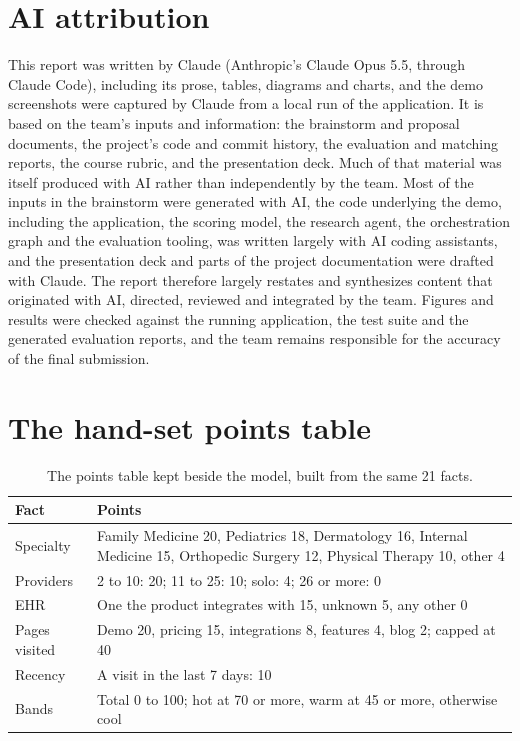 \documentclass[11pt]{article}
\begin{document}
\section*{AI attribution}\label{sec:ai-attribution}

This report was written by Claude (Anthropic's Claude Opus 5.5, through Claude Code), including its prose, tables, diagrams and charts, and the demo screenshots were captured by Claude from a local run of the application. It is based on the team's inputs and information: the brainstorm and proposal documents, the project's code and commit history, the evaluation and matching reports, the course rubric, and the presentation deck. Much of that material was itself produced with AI rather than independently by the team. Most of the inputs in the brainstorm were generated with AI, the code underlying the demo, including the application, the scoring model, the research agent, the orchestration graph and the evaluation tooling, was written largely with AI coding assistants, and the presentation deck and parts of the project documentation were drafted with Claude. The report therefore largely restates and synthesizes content that originated with AI, directed, reviewed and integrated by the team. Figures and results were checked against the running application, the test suite and the generated evaluation reports, and the team remains responsible for the accuracy of the final submission.

\appendix
\section{The hand-set points table}
\label{app:points}

\begin{table}[H]
\centering
\small
\caption{The points table kept beside the model, built from the same 21 facts.}
\begin{tabularx}{\textwidth}{@{}p{2.2cm}L@{}}
\toprule
Fact & Points \\
\midrule
Specialty & Family Medicine 20, Pediatrics 18, Dermatology 16, Internal Medicine 15, Orthopedic Surgery 12, Physical Therapy 10, other 4 \\
Providers & 2 to 10: 20; 11 to 25: 10; solo: 4; 26 or more: 0 \\
EHR & One the product integrates with 15, unknown 5, any other 0 \\
Pages visited & Demo 20, pricing 15, integrations 8, features 4, blog 2; capped at 40 \\
Recency & A visit in the last 7 days: 10 \\
Bands & Total 0 to 100; hot at 70 or more, warm at 45 or more, otherwise cool \\
\bottomrule
\end{tabularx}
\end{table}
\end{document}
